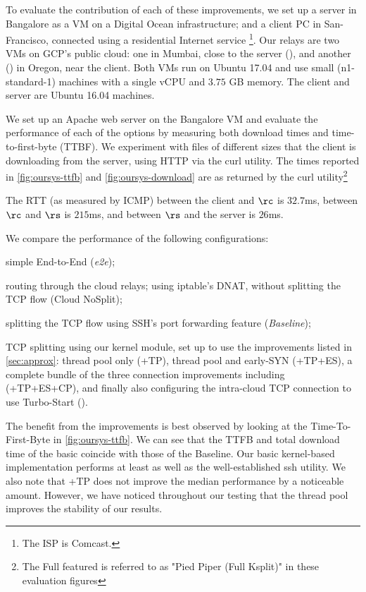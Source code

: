 To evaluate the contribution of each of these improvements, we set up a server in Bangalore as a VM on a Digital Ocean infrastructure; and a client PC in San-Francisco, connected using a residential Internet service \footnote{The ISP is Comcast.}. Our relays are two VMs on GCP's public cloud: one in Mumbai, close to the server (\rs), and another (\rc)  in Oregon, near the client. Both VMs run on Ubuntu 17.04 and use small (n1-standard-1) machines with a single vCPU and $3.75$ GB memory. The client and server are Ubuntu 16.04 machines.

We set up an Apache web server on the Bangalore VM and evaluate the performance of each of the options by measuring both download times and time-to-first-byte (TTBF). We experiment with files of different sizes that the client is downloading from the server, using HTTP via the curl utility. The times reported in \autoref{fig:oursys-ttfb} and \autoref{fig:oursys-download}  are as returned by the curl utility\footnote{The Full featured \oursys is referred to as "Pied Piper (Full Ksplit)" in  these evaluation figures} %

The RTT  (as measured by ICMP) between the client and $\rc$ is $32.7$ms, between $\rc$ and $\rs$ is $215$ms, and between $\rs$ and the server is $26$ms.

We compare the performance of the following configurations: \begin{romanlist}
     \item simple End-to-End (\textit{e2e});
     \item routing through the cloud relays; using iptable's DNAT, without splitting the TCP flow (Cloud NoSplit);
     \item splitting the TCP flow using SSH's port forwarding feature (\textit{Baseline});
     \item TCP splitting using our \oursys kernel module, set up to use the improvements listed in \autoref{sec:approx}: thread pool only (\oursys+TP), thread pool and early-SYN (\oursys+TP+ES), a complete bundle of the three connection improvements including \reconn (\oursys+TP+ES+CP), and finally also configuring the intra-cloud TCP connection to use Turbo-Start (\textit{\oursys}).
\end{romanlist}

The benefit from the improvements is best observed by looking at the Time-To-First-Byte in \autoref{fig:oursys-ttfb}. We can see that the  TTFB and total download time of the basic \oursys coincide with those of the Baseline. Our basic kernel-based implementation performs at least as well as the well-established ssh utility. We also note that \oursys+TP does not improve the median performance by a noticeable amount. However, we have noticed throughout our testing that the thread pool improves the stability of our results.

